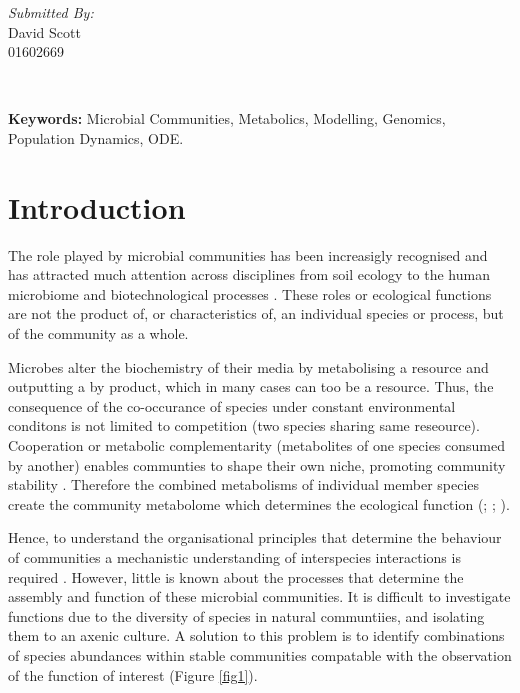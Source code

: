 \documentclass[11pt, onehalfspacing]{article}
\begin{document}
\begin{titlepage}
\begin{minipage}{0.4\textwidth}
		\begin{flushright} \large
			\emph{Submitted By:} \\
			David Scott\\
			01602669\\
		\end{flushright}
		
	\end{minipage}\\[2 cm]
	
\end{titlepage}

\textbf{Keywords:} Microbial Communities, Metabolics, Modelling, Genomics, Population Dynamics, ODE. 

\section{Introduction}
The role played by microbial communities has been increasigly recognised and has attracted much attention across disciplines from soil ecology \citep{torsvik2002microbial} to the human microbiome \citep{ley2008worlds} and biotechnological processes \citep{rabaey2004biofuel}. These roles or ecological functions are not the product of, or characteristics of, an individual species or process, but of the community as a whole. 

Microbes alter the biochemistry of their media by metabolising a resource and outputting a by product, which in many cases can too be a resource. Thus, the consequence of the co-occurance of species under constant environmental conditons is not limited to competition (two species sharing same reseource). Cooperation  or metabolic complementarity (metabolites of one species consumed by another) enables communties to shape their own niche, promoting community stability \citep{freilich2011competitive}. Therefore the combined metabolisms of individual member species create the community metabolome which determines the ecological function (\citep{arrigo2004marine}; \citep{goodman2010our}; \citep{noecker2016metabolic}).

Hence, to understand the organisational principles that determine the behaviour of communities a mechanistic understanding of interspecies interactions is required \citep{henry2016microbial}. However, little is known about the processes that determine the assembly and function of these microbial communities. It is difficult to investigate functions due to the diversity of species in natural communtiies, and isolating them to an axenic culture. A solution to this problem is to identify combinations of species abundances within stable communities compatable with the observation of the function of interest (Figure \ref{fig1}).  
\end{document}
